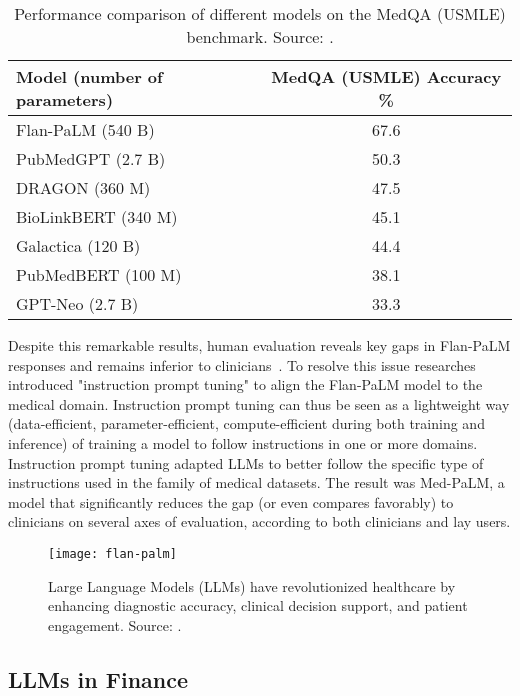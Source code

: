 \begin{table}[!h]
	\centering
	\begin{tabular}{@{}lc@{}}
		\toprule
		Model (number of parameters) & MedQA (USMLE) Accuracy \% \\
		\midrule
		Flan-PaLM (540 B)            & 67.6                      \\
		PubMedGPT (2.7 B)            & 50.3                      \\
		DRAGON (360 M)               & 47.5                      \\
		BioLinkBERT (340 M)          & 45.1                      \\
		Galactica (120 B)            & 44.4                      \\
		PubMedBERT (100 M)           & 38.1                      \\
		GPT-Neo (2.7 B)              & 33.3                      \\
		\bottomrule
	\end{tabular}
	\caption{Performance comparison of different models on the MedQA (USMLE) benchmark. Source: \protect\textcite{singhal2022large}.}
	\label{tab:medqa_performance}
\end{table}

Despite this remarkable results, human evaluation reveals key gaps in Flan-PaLM responses and remains inferior to clinicians~\textcite{singhal2022large}.
To resolve this issue researches introduced "instruction prompt tuning" to align the Flan-PaLM model to the medical domain.
Instruction prompt tuning can thus be seen as a lightweight way (data-efficient, parameter-efficient, compute-efficient during both training and inference) of training a model to follow instructions in one or more domains.
Instruction prompt tuning adapted LLMs to better follow the specific type of instructions used in the family of medical datasets.
The result was Med-PaLM, a model that significantly reduces the gap (or even compares favorably) to clinicians on several axes of evaluation, according to both clinicians and lay users.

\begin{figure}[h!]
	\centering
	\texttt{[image: flan-palm]}
	\caption{Large Language Models (LLMs) have revolutionized healthcare by enhancing diagnostic accuracy, clinical decision support, and patient engagement. Source: \protect\textcite{singhal2022large}.}
	\label{fig:llm-healthcare}
\end{figure}

\subsection{LLMs in Finance}
\label{subsec:llms-in-finance}

